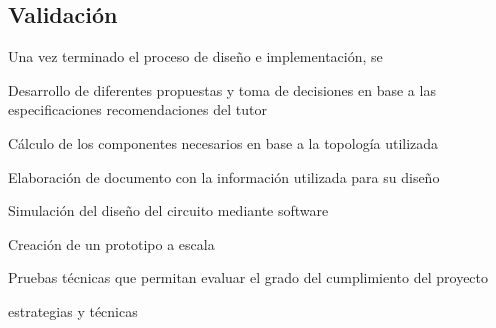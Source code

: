\subsection{Validación}
Una vez terminado el proceso de diseño e implementación, se 

Desarrollo de diferentes propuestas y toma de decisiones en base a las especificaciones recomendaciones del tutor

Cálculo de los componentes necesarios en base a la topología utilizada

Elaboración de documento con la información utilizada para su diseño 

Simulación del diseño del circuito mediante software

Creación de un prototipo a escala

Pruebas técnicas que permitan evaluar el grado del cumplimiento del proyecto

estrategias y técnicas